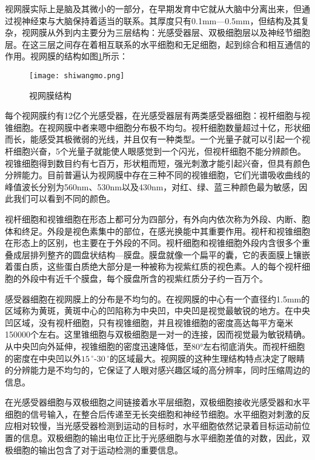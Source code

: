 \documentclass[a4paper,10pt]{article}\large
\begin{document}
视网膜实际上是脑及其微小的一部分\cite{15:book}，在早期发育中它就从大脑中分离出来，但通过视神经束与大脑保持着适当的联系。其厚度只有0.1mm—0.5mm，但结构及其复杂，视网膜从外到内主要分为三层结构：光感受器层、双极细胞层以及神经节细胞层。在这三层之间存在着相互联系的水平细胞和无足细胞，起到综合和相互通信的作用。视网膜的结构如图\ref{fig 5}所示：

\begin{figure}[htb]
\centering
\texttt{[image: shiwangmo.png]}
\caption{视网膜结构}\label{fig 5} 
\end{figure}


每个视网膜约有12亿个光感受器\cite{15:book}，在光感受器层有两类感受器细胞：视杆细胞与视锥细胞。在视网膜中者来嗯中细胞分布极不均匀。视杆细胞数量超过十亿，形状细而长，能感受其极微弱的光线，并且仅有一种类型。一个光量子就可以引起一个视杆细胞兴奋，5个光量子就能使人眼感觉到一个闪光，但视杆细胞不能分辨颜色。视锥细胞得到数目约有七百万，形状粗而短，强光刺激才能引起兴奋，但具有颜色分辨能力。目前普遍认为视网膜中存在三种不同的视锥细胞\cite{17:book}，它们光谱吸收曲线的峰值波长分别为560nm、530nm以及430nm，对红、绿、蓝三种颜色最为敏感，因此我们可以看到不同的颜色。


视杆细胞和视锥细胞在形态上\cite{11:misc}都可分为四部分，有外向内依次称为外段、内断、胞体和终足。外段是视色素集中的部位，在感光换能中其重要作用。视杆和视锥细胞在形态上的区别，也主要在于外段的不同。视杆细胞和视锥细胞外段内含很多个重叠成层排列整齐的圆盘状结构—膜盘。膜盘就像一个扁平的囊，它的表面膜上镶嵌着蛋白质，这些蛋白质绝大部分是一种被称为视紫红质的视色素。人的每个视杆细胞的外段中有近千个膜盘，每个膜盘所含的视紫红质分子约一百万个。


感受器细胞在视网膜上的分布是不均匀的\cite{15:book}。在视网膜的中心有一个直径约1.5mm的区域称为黄斑\cite{11:misc}，黄斑中心的凹陷称为中央凹，中央凹是视觉最敏锐的地方。在中央凹区域，没有视杆细胞，只有视锥细胞，并且视锥细胞的密度高达每平方毫米150000个左右。这里锥细胞与双极细胞是一对一的连接，因而视觉最为敏锐精确。从中央凹向外延伸，视锥细胞的密度迅速降低，至80°左右彻底消失。而视杆细胞的密度在中央凹以外$15\,^{\circ}$-$30\,^{\circ}$的区域最大。视网膜的这种生理结构特点决定了眼睛的分辨能力是不均匀的，它保证了人眼对感兴趣区域的高分辨率，同时压缩周边的信息。


在光感受器细胞与双极细胞之间链接着水平层细胞，双极细胞接收光感受器和水平细胞的信号输入\cite{5:article}，在整合后传递至无长突细胞和神经节细胞。水平细胞对刺激的反应相对较慢，当光感受器检测到运动的目标时，水平细胞依然记录着目标运动前位置的信息。双极细胞的输出电位正比于光感细胞与水平细胞差值的对数，因此，双极细胞的输出包含了对于运动检测的重要信息。
\end{document}
